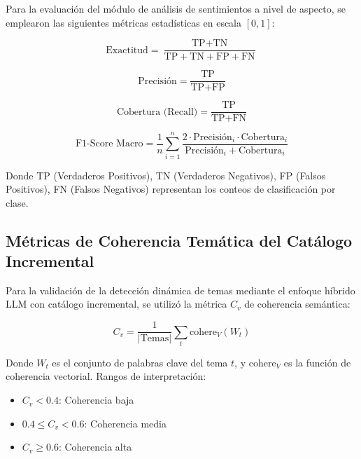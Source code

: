 Para la evaluación del módulo de análisis de sentimientos a nivel de aspecto, se emplearon las siguientes métricas estadísticas en escala $[0, 1]$:

\begin{equation}
\text{Exactitud} = \frac{\text{TP} + \text{TN}}{\text{TP} + \text{TN} + \text{FP} + \text{FN}}
\end{equation}

\begin{equation}
\text{Precisión} = \frac{\text{TP}}{\text{TP} + \text{FP}}
\end{equation}

\begin{equation}
\text{Cobertura (Recall)} = \frac{\text{TP}}{\text{TP} + \text{FN}}
\end{equation}

\begin{equation}
\text{F1-Score Macro} = \frac{1}{n}\sum_{i=1}^{n}\frac{2 \cdot \text{Precisión}_i \cdot \text{Cobertura}_i}{\text{Precisión}_i + \text{Cobertura}_i}
\end{equation}

Donde TP (Verdaderos Positivos), TN (Verdaderos Negativos), FP (Falsos Positivos), FN (Falsos Negativos) representan los conteos de clasificación por clase.

\subsection{Métricas de Coherencia Temática del Catálogo Incremental}

Para la validación de la detección dinámica de temas mediante el enfoque híbrido LLM con catálogo incremental, se utilizó la métrica $C_v$ de coherencia semántica:

\begin{equation}
C_v = \frac{1}{|\text{Temas}|}\sum_{t}\text{cohere}_V(W_t)
\end{equation}

Donde $W_t$ es el conjunto de palabras clave del tema $t$, y $\text{cohere}_V$ es la función de coherencia vectorial. Rangos de interpretación:
\begin{itemize}
	\item $C_v < 0.4$: Coherencia baja
	\item $0.4 \leq C_v < 0.6$: Coherencia media
	\item $C_v \geq 0.6$: Coherencia alta
\end{itemize}

\clearpage

